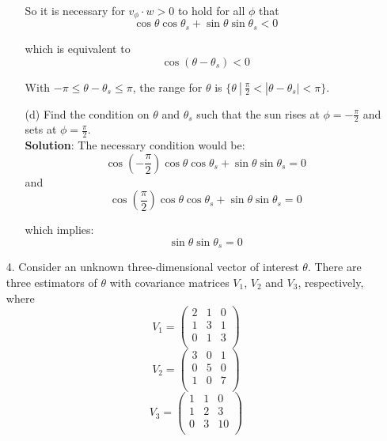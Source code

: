 \documentclass{article}
\begin{document}
\begin{enumerate}
\begin{enumerate}
        So it is necessary for $v_\phi \cdot w > 0$ to hold for all $\phi$ that
        $$\cos\theta \cos\theta_s + \sin\theta \sin\theta_s < 0$$
        
        which is equivalent to 
        $$ \cos (\theta - \theta_s) < 0 $$
        
        With $-\pi \leq \theta - \theta_s \leq \pi$, the range for $\theta$ is $\{\theta\ |\ \frac{\pi}{2} < |\theta - \theta_s| < \pi \}$.\\
        
        \item[(d)] Find the condition on $\theta$ and $\theta_s$ such that the sun rises at $\phi = -\frac{\pi}{2}$ and sets at $\phi = \frac{\pi}{2}$. \\
        
        \textbf{Solution}: The necessary condition would be:
        $$ \cos\left(-\frac{\pi}{2}\right) \cos\theta \cos\theta_s + \sin\theta \sin\theta_s = 0 $$
        and
         $$ \cos\left(\frac{\pi}{2}\right) \cos\theta \cos\theta_s + \sin\theta \sin\theta_s = 0 $$
         
         which implies:
         $$ \sin\theta \sin\theta_s = 0 $$
         
    \end{enumerate}
    
    
    \item[4. ] Consider an unknown three-dimensional vector of interest $\theta$. There are three estimators of $\theta$ with covariance matrices $V_1$, $V_2$ and $V_3$, respectively, where
    $$ V_1 = 
    \begin{pmatrix}
        2 & 1 & 0 \\
        1 & 3 & 1 \\
        0 & 1 & 3 \\
    \end{pmatrix} $$
    $$ V_2 = 
    \begin{pmatrix}
        3 & 0 & 1 \\
        0 & 5 & 0 \\
        1 & 0 & 7 \\
    \end{pmatrix} $$
    $$ V_3 = 
    \begin{pmatrix}
        1 & 1 & 0 \\
        1 & 2 & 3 \\
        0 & 3 & 10 \\
    \end{pmatrix} $$
    

\end{enumerate}
\end{document}
